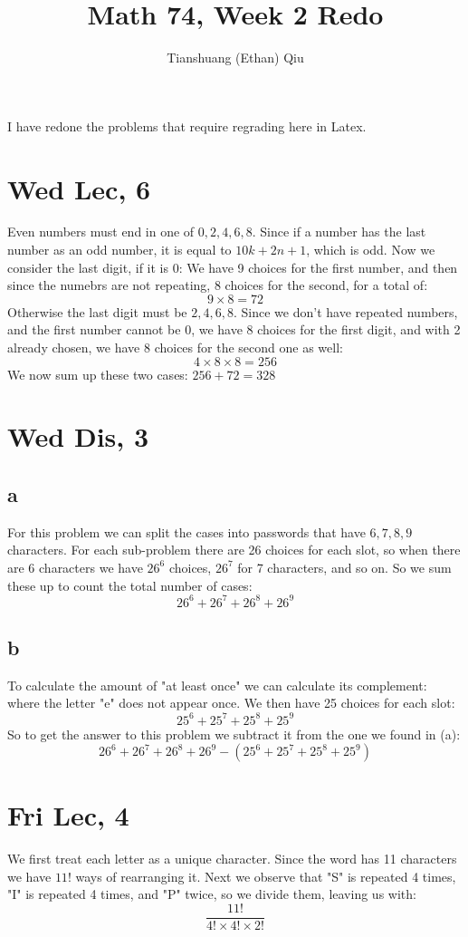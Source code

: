 \documentclass[12pt]{article}
\author{Tianshuang (Ethan) Qiu}
\begin{document}
\title{Math 74, Week 2 Redo}
\maketitle

I have redone the problems that require regrading here in Latex.
\section{Wed Lec, 6}
Even numbers must end in one of $0, 2, 4, 6, 8$. Since if a number has the last number as an odd number, it is equal to $10k + 2n+1$, which is odd.
\newline
Now we consider the last digit, if it is $0$:
\newline
We have 9 choices for the first number, and then since the numebrs are not repeating, 8 choices for the second, for a total of:
$$9 \times 8 = 72$$
Otherwise the last digit must be $2, 4, 6, 8$. Since we don't have repeated numbers, and the first number cannot be $0$, we have 8 choices for the first digit, and with 2 already chosen, we have 8 choices for the second one as well:
$$4 \times 8 \times 8 = 256$$
We now sum up these two cases: $256 + 72 = 328$

\section{Wed Dis, 3}

\subsection{a}
For this problem we can split the cases into passwords that have $6,7,8,9$ characters. For each sub-problem there are 26 choices for each slot, so when there are 6 characters we have $26^6$ choices, $26^7$ for 7 characters, and so on.
\newline
So we sum these up to count the total number of cases:
$$26^6+26^7+26^8+26^9$$


\subsection{b}
To calculate the amount of "at least once" we can calculate its complement: where the letter "e" does not appear once. We then have 25 choices for each slot:
$$25^6+25^7+25^8+25^9$$
So to get the answer to this problem we subtract it from the one we found in (a):
$$26^6+26^7+26^8+26^9-(25^6+25^7+25^8+25^9)$$


\section{Fri Lec, 4}
We first treat each letter as a unique character. Since the word has 11 characters we have $11!$ ways of rearranging it.
\newline
Next we observe that "S" is repeated 4 times, "I" is repeated 4 times, and "P" twice, so we divide them, leaving us with:
\newline
$$\frac{11!}{4!\times4!\times2!}$$
\end{document}
